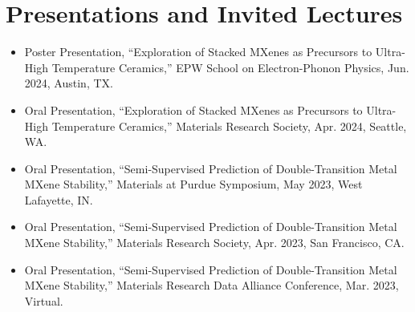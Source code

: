 \documentclass[11pt]{article}
\begin{document}
\section*{Presentations and Invited Lectures}

\begin{itemize}[leftmargin=1.5em]
  \item Poster Presentation, ``Exploration of Stacked MXenes as Precursors to Ultra-High Temperature Ceramics,'' EPW School on Electron-Phonon Physics, Jun. 2024, Austin, TX.
  \item Oral Presentation, ``Exploration of Stacked MXenes as Precursors to Ultra-High Temperature Ceramics,'' Materials Research Society, Apr. 2024, Seattle, WA.
  \item Oral Presentation, ``Semi-Supervised Prediction of Double-Transition Metal MXene Stability,'' Materials at Purdue Symposium, May 2023, West Lafayette, IN.
  \item Oral Presentation, ``Semi-Supervised Prediction of Double-Transition Metal MXene Stability,'' Materials Research Society, Apr. 2023, San Francisco, CA.
  \item Oral Presentation, ``Semi-Supervised Prediction of Double-Transition Metal MXene Stability,'' Materials Research Data Alliance Conference, Mar. 2023, Virtual.
\end{itemize}
\end{document}
